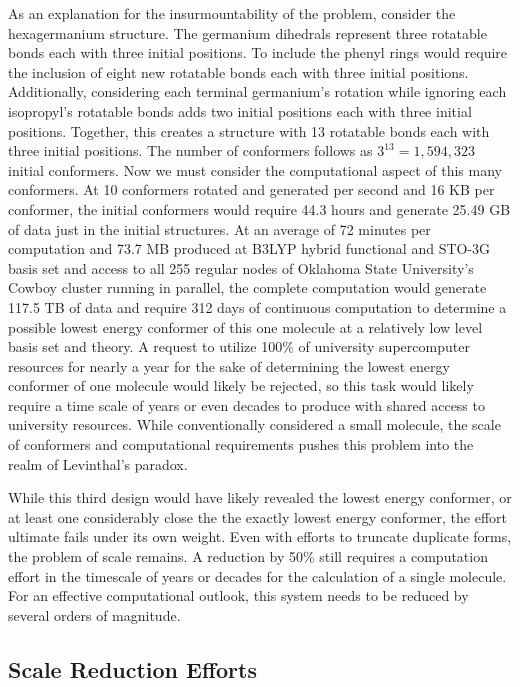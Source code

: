 As an explanation for the insurmountability of the problem, consider the hexagermanium structure. 
The germanium dihedrals represent three rotatable bonds each with three initial positions. 
To include the phenyl rings would require the inclusion of eight new rotatable bonds each with three initial positions.
Additionally, considering each terminal germanium's rotation while ignoring each isopropyl's rotatable bonds adds two initial positions each with three initial positions. 
Together, this creates a structure with 13 rotatable bonds each with three initial positions. The number of conformers follows as $3^{13} = 1,594,323$ initial conformers. 
Now we must consider the computational aspect of this many conformers.
At 10 conformers rotated and generated per second and 16 KB per conformer, the initial conformers would require 44.3 hours and generate 25.49 GB of data just in the initial structures.
At an average of 72 minutes per computation and 73.7 MB produced at B3LYP hybrid functional and STO-3G basis set and access to all 255 regular nodes of Oklahoma State University's Cowboy cluster running in parallel, the complete computation would generate 117.5 TB of data and require 312 days of continuous computation to determine a possible lowest energy conformer of this one molecule at a relatively low level basis set and theory.
A request to utilize 100\% of university supercomputer resources for nearly a year for the sake of determining the lowest energy conformer of one molecule would likely be rejected, so this task would likely require a time scale of years or even decades to produce with shared access to university resources. 
While conventionally considered a small molecule, the scale of conformers and computational requirements pushes this problem into the realm of Levinthal's paradox.

While this third design would have likely revealed the lowest energy conformer, or at least one considerably close the the exactly lowest energy conformer, the effort ultimate fails under its own weight.
Even with efforts to truncate duplicate forms, the problem of scale remains.
A reduction by 50\% still requires a computation effort in the timescale of years or decades for the calculation of a single molecule.
For an effective computational outlook, this system needs to be reduced by several orders of magnitude.

\subsection{Scale Reduction Efforts}

